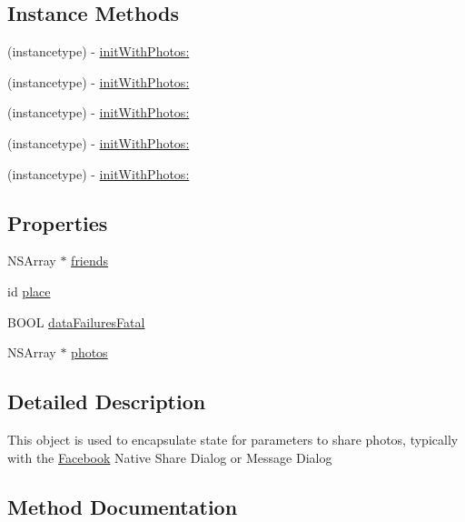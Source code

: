 \subsection*{Instance Methods}
\begin{DoxyCompactItemize}
\item 
(instancetype) -\/ \hyperlink{interfaceFBPhotoParams_aa20322b48f3dc61260103228cab4dc33}{init\+With\+Photos\+:}
\item 
(instancetype) -\/ \hyperlink{interfaceFBPhotoParams_aa20322b48f3dc61260103228cab4dc33}{init\+With\+Photos\+:}
\item 
(instancetype) -\/ \hyperlink{interfaceFBPhotoParams_aa20322b48f3dc61260103228cab4dc33}{init\+With\+Photos\+:}
\item 
(instancetype) -\/ \hyperlink{interfaceFBPhotoParams_aa20322b48f3dc61260103228cab4dc33}{init\+With\+Photos\+:}
\item 
(instancetype) -\/ \hyperlink{interfaceFBPhotoParams_aa20322b48f3dc61260103228cab4dc33}{init\+With\+Photos\+:}
\end{DoxyCompactItemize}
\subsection*{Properties}
\begin{DoxyCompactItemize}
\item 
N\+S\+Array $\ast$ \hyperlink{interfaceFBPhotoParams_a7c7882485d0b683202f3f0a30518a4a0}{friends}
\item 
id \hyperlink{interfaceFBPhotoParams_a109c4a005dd1830e5e3d735eddb3672d}{place}
\item 
B\+O\+OL \hyperlink{interfaceFBPhotoParams_a34bfb005e05464a861ea96ce7e532b44}{data\+Failures\+Fatal}
\item 
N\+S\+Array $\ast$ \hyperlink{interfaceFBPhotoParams_a38a64b6d4b61d659f517ec246b26eedb}{photos}
\end{DoxyCompactItemize}


\subsection{Detailed Description}
This object is used to encapsulate state for parameters to share photos, typically with the \hyperlink{interfaceFacebook}{Facebook} Native Share Dialog or Message Dialog 

\subsection{Method Documentation}
\mbox{\label{interfaceFBPhotoParams_aa20322b48f3dc61260103228cab4dc33}} 
